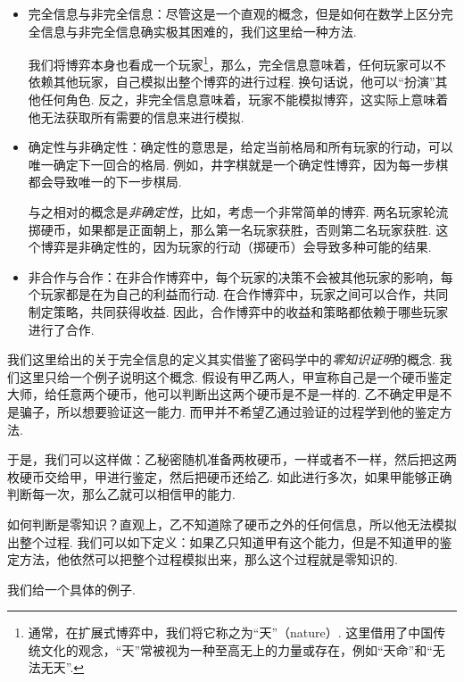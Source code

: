 \begin{itemize}
    \item 完全信息与非完全信息：尽管这是一个直观的概念，但是如何在数学上区分完全信息与非完全信息确实极其困难的，我们这里给一种方法. 
    
    我们将博弈本身也看成一个玩家\footnote{通常，在扩展式博弈中，我们将它称之为“天”（nature）. 这里借用了中国传统文化的观念，“天”常被视为一种至高无上的力量或存在，例如“天命”和“无法无天”. }，那么，完全信息意味着，任何玩家可以不依赖其他玩家，自己模拟出整个博弈的进行过程. 换句话说，他可以“扮演”其他任何角色. 反之，非完全信息意味着，玩家不能模拟博弈，这实际上意味着他无法获取所有需要的信息来进行模拟. 

    \item 确定性与非确定性：确定性的意思是，给定当前格局和所有玩家的行动，可以唯一确定下一回合的格局. 例如，井字棋就是一个确定性博弈，因为每一步棋都会导致唯一的下一步棋局.
    
    与之相对的概念是\emph{非确定性}，比如，考虑一个非常简单的博弈. 两名玩家轮流掷硬币，如果都是正面朝上，那么第一名玩家获胜，否则第二名玩家获胜. 这个博弈是非确定性的，因为玩家的行动（掷硬币）会导致多种可能的结果.

    \item 非合作与合作：在非合作博弈中，每个玩家的决策不会被其他玩家的影响，每个玩家都是在为自己的利益而行动. 在合作博弈中，玩家之间可以合作，共同制定策略，共同获得收益. 因此，合作博弈中的收益和策略都依赖于哪些玩家进行了合作. 
\end{itemize}

\begin{remark}
    我们这里给出的关于完全信息的定义其实借鉴了密码学中的\emph{零知识证明}的概念. 我们这里只给一个例子说明这个概念. 假设有甲乙两人，甲宣称自己是一个硬币鉴定大师，给任意两个硬币，他可以判断出这两个硬币是不是一样的. 乙不确定甲是不是骗子，所以想要验证这一能力. 而甲并不希望乙通过验证的过程学到他的鉴定方法. 
    
    于是，我们可以这样做：乙秘密随机准备两枚硬币，一样或者不一样，然后把这两枚硬币交给甲，甲进行鉴定，然后把硬币还给乙. 如此进行多次，如果甲能够正确判断每一次，那么乙就可以相信甲的能力. 

    如何判断是零知识？直观上，乙不知道除了硬币之外的任何信息，所以他无法模拟出整个过程. 我们可以如下定义：如果乙只知道甲有这个能力，但是不知道甲的鉴定方法，他依然可以把整个过程模拟出来，那么这个过程就是零知识的. 
\end{remark}

我们给一个具体的例子. 

